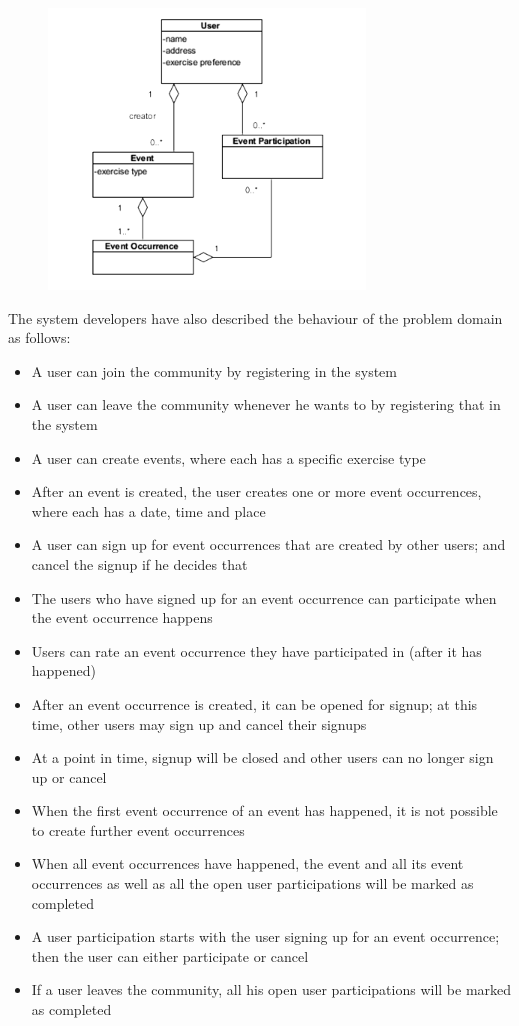 \begin{figure}[H]
    \centering
    \includegraphics[width=0.75\textwidth]{figures/assignment1-2classdiagram2018.png}
\end{figure}

The system developers have also described the behaviour of the problem domain as follows:
\begin{itemize}
    \item A user can join the community by registering in the system
    \item A user can leave the community whenever he wants to by registering that in the system 
    \item A user can create events, where each has a specific exercise type
    \item After an event is created, the user creates one or more event occurrences, where each has a date, time and place 
    \item A user can sign up for event occurrences that are created by other users; and cancel the signup if he decides that 
    \item The users who have signed up for an event occurrence can participate when the event occurrence happens 
    \item Users can rate an event occurrence they have participated in (after it has happened)
    \item After an event occurrence is created, it can be opened for signup; at this time, other users may sign up and cancel their signups 
    \item At a point in time, signup will be closed and other users can no longer sign up or cancel
    \item When the first event occurrence of an event has happened, it is not possible to create further event occurrences 
    \item When all event occurrences have happened, the event and all its event occurrences as well as all the open user participations will be marked as completed 
    \item A user participation starts with the user signing up for an event occurrence; then the user can either participate or cancel 
    \item If a user leaves the community, all his open user participations will be marked as completed 
\end{itemize}
